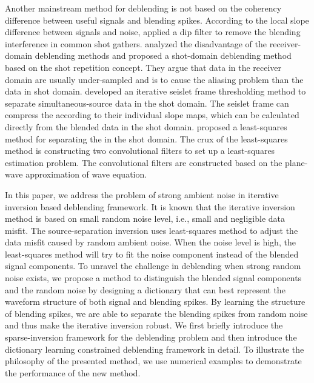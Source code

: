 Another mainstream method for deblending is not based on the coherency difference between useful signals and blending spikes. According to the local slope difference between signals and noise, \cite{hampson2008} applied a dip filter to remove the blending interference in common shot gathers. \cite{sixue2015} analyzed the disadvantage of the receiver-domain deblending methods and proposed a shot-domain deblending method based on the shot repetition concept. They argue that data in the receiver domain are usually under-sampled and is  to cause the aliasing problem than the data in shot domain. \cite{shuwei20163} developed an iterative seislet frame thresholding method to separate simultaneous-source data in the shot domain. The seislet frame can compress the  according to their individual slope maps, which can be calculated directly from the blended data in the shot domain. \cite{shaohuan2017} proposed a least-squares method for separating the  in the shot domain. The crux of the least-squares method is constructing two convolutional filters to set up a least-squares estimation problem. The convolutional filters are constructed based on the plane-wave approximation of wave equation.   

In this paper, we address the problem of strong ambient noise in iterative inversion based deblending framework. It is known that the iterative inversion method is based on small random noise level, i.e., small and negligible data misfit. The source-separation inversion uses least-squares method to adjust the data misfit caused by random ambient noise. When the noise level is high, the least-squares method will try to fit the noise component instead of the blended signal components. To unravel the challenge in deblending when strong random noise exists, we propose a method to distinguish the blended signal components and the random noise by designing a dictionary that can best represent the waveform structure of both signal and blending spikes. By learning the structure of  blending spikes, we are able to separate the blending spikes from random noise and thus make the iterative inversion robust. We first briefly introduce the sparse-inversion framework for the deblending problem and then introduce the dictionary learning constrained deblending framework in detail. To illustrate the philosophy of the presented method, we use numerical examples to demonstrate the performance of the new method.

